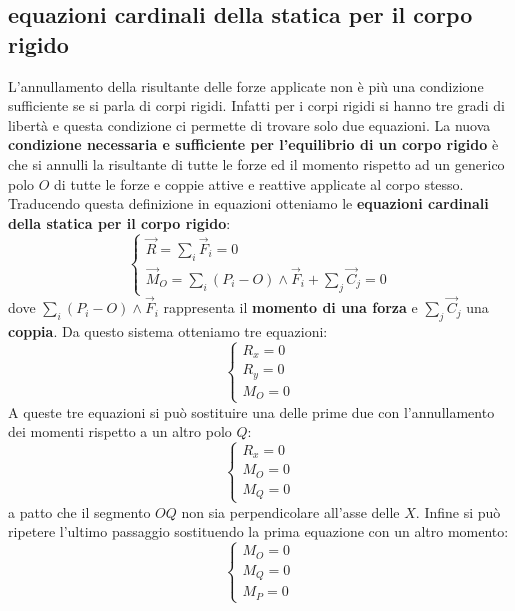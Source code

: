 \subsection{equazioni cardinali della statica per il corpo rigido}
L'annullamento della risultante delle forze applicate non è più una condizione sufficiente se si parla di corpi rigidi. Infatti per i corpi rigidi si hanno tre gradi di libertà e questa condizione ci permette di trovare solo due equazioni.\newline
\newline
La nuova \textbf{condizione necessaria e sufficiente per l'equilibrio di un corpo rigido} è che si annulli la risultante di tutte le forze ed il momento rispetto ad un generico polo $O$ di tutte le forze e coppie attive e reattive applicate al corpo stesso.\newline
\newline
Traducendo questa definizione in equazioni otteniamo le \textbf{equazioni cardinali della statica per il corpo rigido}:
\[
    \begin{cases}
        \vec{R} = \sum_{i} \vec{F}_i = 0\\
        \vec{M}_O = \sum_{i} (P_i - O) \land \vec{F}_i + \sum_{j} \vec{C}_j = 0
    \end{cases}
\]
dove $\sum_{i} (P_i - O) \land \vec{F}_i$ rappresenta il \textbf{momento di una forza} e $\sum_{j} \vec{C}_j$ una \textbf{coppia}.\newline
\newline
Da questo sistema otteniamo tre equazioni:
\[
    \begin{cases}
        R_x = 0\\
        R_y = 0\\
        M_O = 0
    \end{cases}
\]
A queste tre equazioni si può sostituire una delle prime due con l'annullamento dei momenti rispetto a un altro polo $Q$:
\[
    \begin{cases}
        R_x = 0\\
        M_O = 0\\
        M_Q = 0
    \end{cases}
\]
a patto che il segmento $OQ$ non sia perpendicolare all'asse delle $X$.\newline
Infine si può ripetere l'ultimo passaggio sostituendo la prima equazione con un altro momento:
\[
    \begin{cases}
        M_O = 0\\
        M_Q = 0\\
        M_P = 0
    \end{cases}
\]
